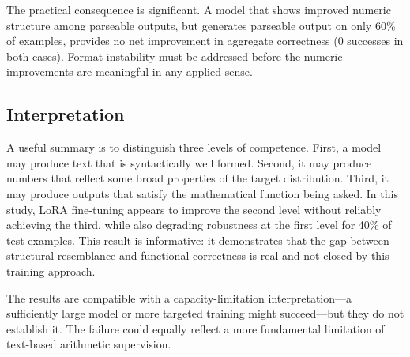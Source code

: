 The practical consequence is significant. A model that shows improved numeric structure among parseable outputs, but generates parseable output on only 60\% of examples, provides no net improvement in aggregate correctness (0 successes in both cases). Format instability must be addressed before the numeric improvements are meaningful in any applied sense.

\subsection{Interpretation}

A useful summary is to distinguish three levels of competence. First, a model may produce text that is syntactically well formed. Second, it may produce numbers that reflect some broad properties of the target distribution. Third, it may produce outputs that satisfy the mathematical function being asked. In this study, LoRA fine-tuning appears to improve the second level without reliably achieving the third, while also degrading robustness at the first level for 40\% of test examples. This result is informative: it demonstrates that the gap between structural resemblance and functional correctness is real and not closed by this training approach.

The results are compatible with a capacity-limitation interpretation---a sufficiently large model or more targeted training might succeed---but they do not establish it. The failure could equally reflect a more fundamental limitation of text-based arithmetic supervision.

